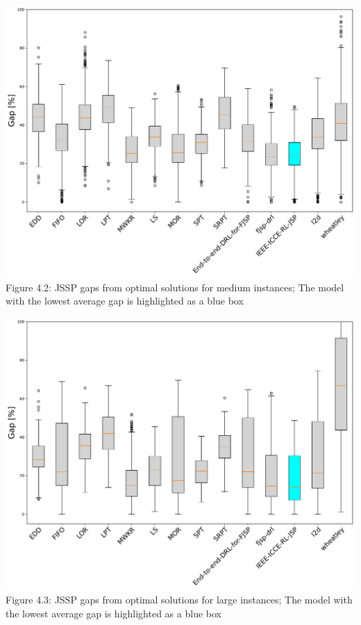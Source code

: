 \begin{center}
    \includegraphics[width=0.8\linewidth]{images/horizontal_boxplot_jssp_medium.pdf}\\
    Figure 4.2: JSSP gaps from optimal solutions for medium instances; The model with the lowest average gap is highlighted as a blue box
\end{center}
\begin{center}
    \includegraphics[width=0.8\linewidth]{images/horizontal_boxplot_jssp_large.pdf}\\
    Figure 4.3: JSSP gaps from optimal solutions for large instances; The model with the lowest average gap is highlighted as a blue box
\end{center}
